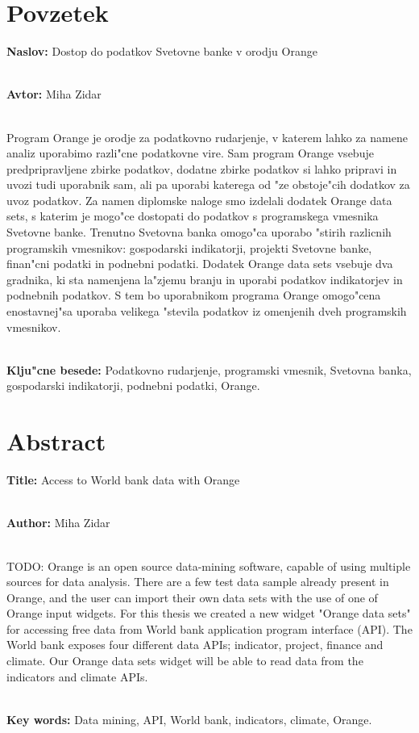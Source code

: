 \chapter*{Povzetek}


\textbf{Naslov:} Dostop do podatkov Svetovne banke v orodju Orange

\ \\
\textbf{Avtor:} Miha Zidar

\ \\
Program Orange je orodje za podatkovno rudarjenje, v katerem
lahko za namene analiz uporabimo razli"cne podatkovne vire. Sam program Orange
vsebuje predpripravljene zbirke podatkov, dodatne zbirke podatkov si lahko 
pripravi in uvozi tudi uporabnik sam, ali pa uporabi katerega od "ze obstoje"cih
dodatkov za uvoz podatkov. Za namen diplomske naloge smo izdelali dodatek 
Orange data sets, s katerim je mogo"ce dostopati do podatkov s programskega 
vmesnika Svetovne banke. Trenutno Svetovna banka omogo"ca uporabo "stirih 
razlicnih programskih vmesnikov: gospodarski indikatorji, projekti Svetovne banke, 
finan"cni podatki in podnebni podatki. Dodatek Orange data sets vsebuje dva
gradnika, ki sta namenjena la"zjemu branju in uporabi podatkov indikatorjev in 
podnebnih podatkov.
S tem bo uporabnikom programa Orange omogo"cena enostavnej"sa uporaba velikega "stevila
podatkov iz omenjenih dveh programskih vmesnikov.

\ \\
\textbf{Klju"cne besede:} Podatkovno rudarjenje, programski vmesnik, 
Svetovna banka, gospodarski indikatorji, podnebni podatki, Orange. 




\clearemptydoublepage

\chapter*{Abstract}


\textbf{Title:} Access to World bank data with Orange

\ \\
\textbf{Author:} Miha Zidar

\ \\
TODO: Orange is an open source data-mining software, capable of using multiple
sources for data analysis. There are a few test data sample already present
in Orange, and the user can import their own data sets with the use of one of
Orange input widgets. For this thesis we created a new widget "Orange data sets"
for accessing free data from World bank application program interface (API).
The World bank exposes four different data APIs; indicator, project, finance
and climate. Our Orange data sets widget will be able to read data from the
indicators and climate APIs.


\ \\
\textbf{Key words:} Data mining, API, World bank, indicators, climate, Orange.

